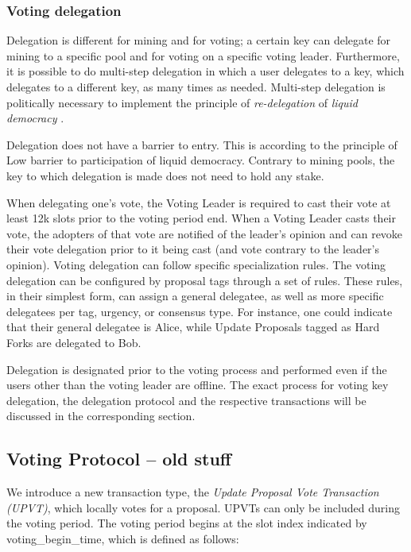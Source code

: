 \subsubsection*{Voting delegation}

Delegation is different for mining and for voting; a certain key can delegate for mining to a specific pool and for voting on a specific voting leader. Furthermore, it is possible to do multi-step delegation in which a user delegates to a key, which delegates to a different key, as many times as needed. Multi-step delegation is politically necessary to implement the principle of \emph{re-delegation} of \emph{liquid democracy} \cite{liqdemocracy}.

Delegation does not have a barrier to entry. This is according to the principle of Low barrier to participation of liquid democracy. Contrary to mining pools, the key to which delegation is made does not need to hold any stake.

When delegating one's vote, the Voting Leader is required to cast their vote at least 12k slots prior to the voting period end. When a Voting Leader casts their vote, the adopters of that vote are notified of the leader's opinion and can revoke their vote delegation prior to it being cast (and vote contrary to the leader's opinion).
Voting delegation can follow specific specialization rules. The voting delegation can be configured by proposal tags through a set of rules. These rules, in their simplest form, can assign a general delegatee, as well as more specific delegatees per tag, urgency, or consensus type. For instance, one could indicate that their general delegatee is Alice, while Update Proposals tagged as Hard Forks are delegated to Bob.

Delegation is designated prior to the voting process and performed even if the users other than the voting leader are offline. The exact process for voting key delegation, the delegation protocol and the respective transactions will be discussed in the corresponding section.

\subsection*{Voting Protocol -- old stuff}
We introduce a new transaction type, the \emph{Update Proposal Vote Transaction (UPVT)}, which locally votes for a proposal. UPVTs can only be included during the voting period. 
The voting period begins at the slot index indicated by voting\_begin\_time, which is defined as follows:


